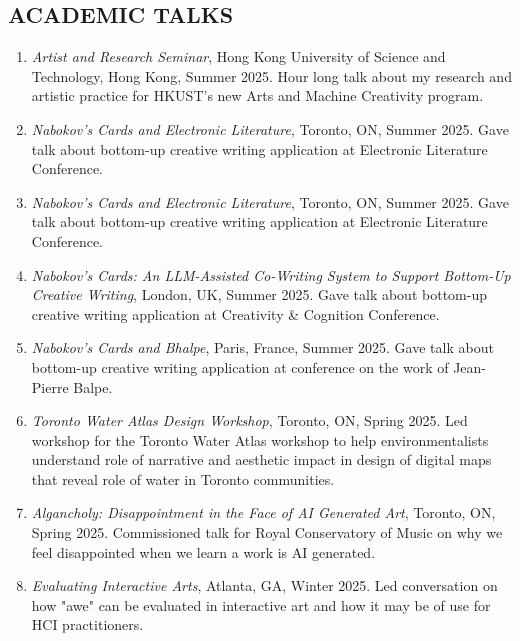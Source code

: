  \subsection{ACADEMIC TALKS}
 
 \begin{enumerate}
 
    \item \emph{Artist and Research Seminar}, Hong Kong University of Science and Technology, Hong Kong, Summer 2025. \subitem Hour long talk about my research and artistic practice for HKUST's new Arts and Machine Creativity program. 
 
   \item \emph{Nabokov's Cards and Electronic Literature}, Toronto, ON, Summer 2025. \subitem Gave talk about bottom-up creative writing application at Electronic Literature Conference. 
 
  \item \emph{Nabokov's Cards and Electronic Literature}, Toronto, ON, Summer 2025. \subitem Gave talk about bottom-up creative writing application at Electronic Literature Conference. 

   \item \emph{Nabokov's Cards: An LLM-Assisted Co-Writing System to Support Bottom-Up
Creative Writing}, London, UK, Summer 2025. \subitem Gave talk about bottom-up creative writing application at Creativity \& Cognition Conference. 
   
   \item \emph{Nabokov's Cards and Bhalpe}, Paris, France, Summer 2025. \subitem Gave talk about bottom-up creative writing application at conference on the work of Jean-Pierre Balpe. 
 
  \item \emph{Toronto Water Atlas Design Workshop}, Toronto, ON, Spring 2025. \subitem Led workshop for the Toronto Water Atlas workshop to help environmentalists understand role of narrative and aesthetic impact in design of digital maps that reveal role of water in Toronto communities. 
 
 \item \emph{Algancholy: Disappointment in the Face of AI Generated Art}, Toronto, ON, Spring 2025. \subitem Commissioned talk for Royal Conservatory of Music on why we feel disappointed when we learn a work is AI generated. 
 
  \item  \emph{Evaluating Interactive Arts}, Atlanta, GA, Winter 2025. \subitem Led conversation on how "awe" can be evaluated in interactive art and how it may be of use for HCI practitioners.
  

\end{enumerate}
